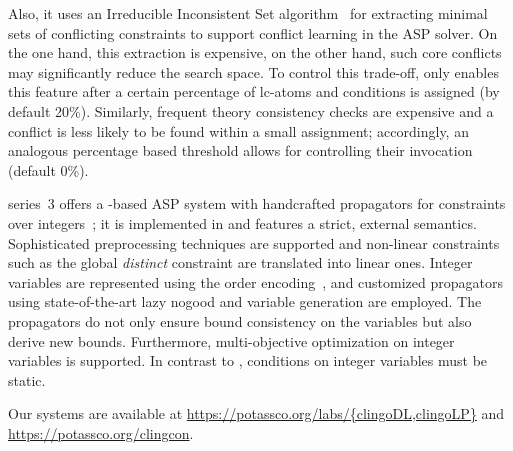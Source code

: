 Also, it uses an Irreducible Inconsistent Set algorithm~\cite{loon81}
for extracting minimal sets of conflicting constraints to support conflict learning in the ASP solver.
On the one hand, this extraction is expensive, on the other hand, such core conflicts may significantly reduce the search space. 
To control this trade-off,  only enables this feature after a certain percentage of lc-atoms and conditions is assigned (by default 20\%).
Similarly,
frequent theory consistency checks are expensive and a conflict is less likely to be found within a small assignment;
accordingly, an analogous percentage based threshold allows for controlling their invocation (default 0\%). 
%

\textbf{\clingcon} series~3 offers a \clingo-based ASP system with handcrafted propagators for constraints over integers~\cite{bakaossc16a};
it is implemented in \cpp{} and features a strict, external semantics.
Sophisticated preprocessing techniques are supported
and non-linear constraints such as the global \emph{distinct} constraint are translated into linear ones.
Integer variables are represented using the order encoding~\cite{crabak94a},
and customized propagators using state-of-the-art lazy nogood and variable generation are employed.
The propagators do not only ensure bound consistency on the variables
but also derive new bounds.
Furthermore,
multi-objective optimization on integer variables is supported.
In contrast to ,
conditions on integer variables must be static.

Our systems are available at \url{https://potassco.org/labs/{clingoDL,clingoLP}}
and \url{https://potassco.org/clingcon}.


